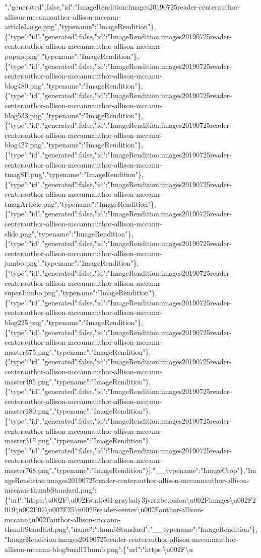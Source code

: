 ","generated":false,"id":"ImageRendition:images20190725reader-centerauthor-allison-mccannauthor-allison-mccann-articleLarge.png","typename":"ImageRendition"\},\{"type":"id","generated":false,"id":"ImageRendition:images20190725reader-centerauthor-allison-mccannauthor-allison-mccann-popup.png","typename":"ImageRendition"\},\{"type":"id","generated":false,"id":"ImageRendition:images20190725reader-centerauthor-allison-mccannauthor-allison-mccann-blog480.png","typename":"ImageRendition"\},\{"type":"id","generated":false,"id":"ImageRendition:images20190725reader-centerauthor-allison-mccannauthor-allison-mccann-blog533.png","typename":"ImageRendition"\},\{"type":"id","generated":false,"id":"ImageRendition:images20190725reader-centerauthor-allison-mccannauthor-allison-mccann-blog427.png","typename":"ImageRendition"\},\{"type":"id","generated":false,"id":"ImageRendition:images20190725reader-centerauthor-allison-mccannauthor-allison-mccann-tmagSF.png","typename":"ImageRendition"\},\{"type":"id","generated":false,"id":"ImageRendition:images20190725reader-centerauthor-allison-mccannauthor-allison-mccann-tmagArticle.png","typename":"ImageRendition"\},\{"type":"id","generated":false,"id":"ImageRendition:images20190725reader-centerauthor-allison-mccannauthor-allison-mccann-slide.png","typename":"ImageRendition"\},\{"type":"id","generated":false,"id":"ImageRendition:images20190725reader-centerauthor-allison-mccannauthor-allison-mccann-jumbo.png","typename":"ImageRendition"\},\{"type":"id","generated":false,"id":"ImageRendition:images20190725reader-centerauthor-allison-mccannauthor-allison-mccann-superJumbo.png","typename":"ImageRendition"\},\{"type":"id","generated":false,"id":"ImageRendition:images20190725reader-centerauthor-allison-mccannauthor-allison-mccann-blog225.png","typename":"ImageRendition"\},\{"type":"id","generated":false,"id":"ImageRendition:images20190725reader-centerauthor-allison-mccannauthor-allison-mccann-master675.png","typename":"ImageRendition"\},\{"type":"id","generated":false,"id":"ImageRendition:images20190725reader-centerauthor-allison-mccannauthor-allison-mccann-master495.png","typename":"ImageRendition"\},\{"type":"id","generated":false,"id":"ImageRendition:images20190725reader-centerauthor-allison-mccannauthor-allison-mccann-master180.png","typename":"ImageRendition"\},\{"type":"id","generated":false,"id":"ImageRendition:images20190725reader-centerauthor-allison-mccannauthor-allison-mccann-master315.png","typename":"ImageRendition"\},\{"type":"id","generated":false,"id":"ImageRendition:images20190725reader-centerauthor-allison-mccannauthor-allison-mccann-master768.png","typename":"ImageRendition"\}{]},"\_\_typename":"ImageCrop"\},"ImageRendition:images20190725reader-centerauthor-allison-mccannauthor-allison-mccann-thumbStandard.png":\{"url":"https:\textbackslash{}u002F\textbackslash{}u002Fstatic01.graylady3jvrrxbe.onion\textbackslash{}u002Fimages\textbackslash{}u002F2019\textbackslash{}u002F07\textbackslash{}u002F25\textbackslash{}u002Freader-center\textbackslash{}u002Fauthor-allison-mccann\textbackslash{}u002Fauthor-allison-mccann-thumbStandard.png","name":"thumbStandard","\_\_typename":"ImageRendition"\},"ImageRendition:images20190725reader-centerauthor-allison-mccannauthor-allison-mccann-blogSmallThumb.png":\{"url":"https:\textbackslash{}u002F\textbackslash{}u